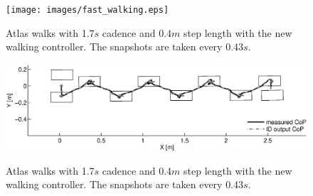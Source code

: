 \documentclass{ws-ijhr}
\begin{document}
\begin{figure} 
  \begin{center}
    {\texttt{[image: images/fast\_walking.eps]}}
    \caption{Atlas walks with 1.7$s$ cadence and 0.4$m$ step length with the
		new walking controller. The snapshots are taken every 0.43$s$.} 
		\label{fig:fast_walking}
  \end{center}
\end{figure}   

\begin{figure} 
  \begin{center}
    {\includegraphics[width=1\textwidth]{images/new_cop.eps}}
    \caption{Atlas walks with 1.7$s$ cadence and 0.4$m$ step length with the
		new walking controller. The snapshots are taken every 0.43$s$.} 
		\label{fig:fast_walking}
  \end{center}
\end{figure}   
 

\end{document}
